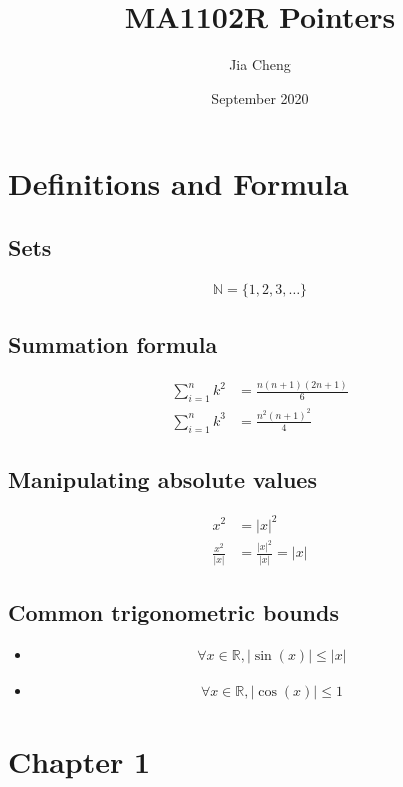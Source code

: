 \documentclass{article}
\title{MA1102R Pointers}
\author{Jia Cheng}
\date{September 2020}
\begin{document}
\maketitle

\section{Definitions and Formula}
\subsection{Sets}
\begin{align*}
    \mathbb{N}=\{1,2,3,\dots\}
\end{align*}

\subsection{Summation formula}
\begin{align*}
    \sum_{i=1}^nk^2&=\frac{n(n+1)(2n+1)}{6}\\
    \sum_{i=1}^nk^3&=\frac{n^2(n+1)^2}{4}
\end{align*}

\subsection{Manipulating absolute values}
\begin{align*}
	x^2&=|x|^2\\
	\frac{x^2}{|x|}&=\frac{|x|^2}{|x|}=|x|
\end{align*}

\subsection{Common trigonometric bounds}
\begin{itemize}
	\item \begin{align*}
		\forall x\in \mathbb{R}, |\sin(x)| \leq |x|
	\end{align*}
	\item \begin{align*}
		\forall x\in \mathbb{R}, |\cos(x)| \leq 1
	\end{align*}
\end{itemize}

\section{Chapter 1}
\end{document}
